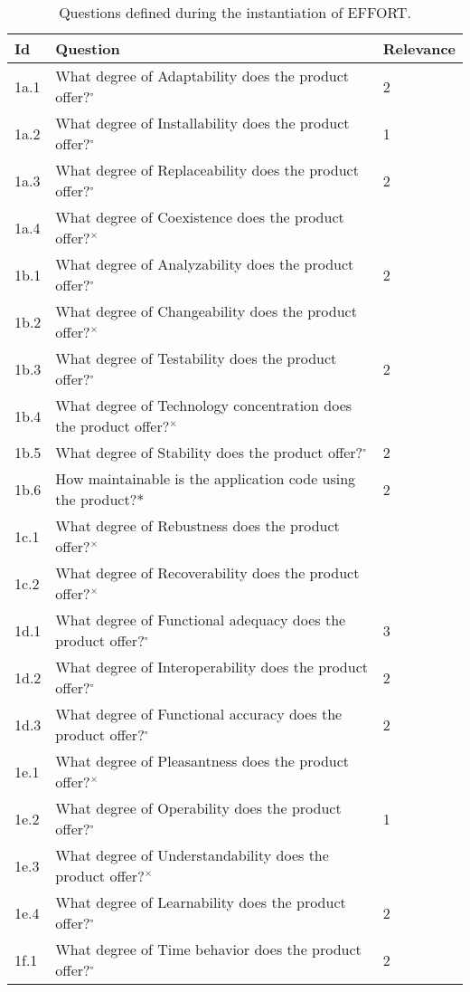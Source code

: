 \begin{longtable}[]{|p{1cm}p{10cm}p{2cm}|}
    \caption{Questions defined during the instantiation of EFFORT.}
    \label{table:questions_minified}\\
    \toprule
Id & Question & Relevance \\
\midrule
\endhead
1a.1 & What degree of Adaptability does the product offer?$^{\square}$ & 2 \\
1a.2 & What degree of Installability does the product offer?$^{\square}$ & 1 \\
1a.3 & What degree of Replaceability does the product offer?$^{\square}$ & 2 \\
1a.4 & What degree of Coexistence does the product offer?$^{\times}$ & \\
1b.1 & What degree of Analyzability does the product offer?$^{\square}$ & 2 \\
1b.2 & What degree of Changeability does the product offer?$^{\times}$ & \\
1b.3 & What degree of Testability does the product offer?$^{\square}$ & 2 \\
1b.4 & What degree of Technology concentration does the product offer?$^{\times}$ & \\
1b.5 & What degree of Stability does the product offer?$^{\square}$ & 2 \\
1b.6 & How maintainable is the application code using the product?* & 2 \\
1c.1 & What degree of Rebustness does the product offer?$^{\times}$ & \\
1c.2 & What degree of Recoverability does the product offer?$^{\times}$ & \\
1d.1 & What degree of Functional adequacy does the product offer?$^{\square}$ & 3 \\
1d.2 & What degree of Interoperability does the product offer?$^{\square}$ & 2 \\
1d.3 & What degree of Functional accuracy does the product offer?$^{\square}$ & 2 \\
1e.1 & What degree of Pleasantness does the product offer?$^{\times}$ & \\
1e.2 & What degree of Operability does the product offer?$^{\square}$ & 1 \\
1e.3 & What degree of Understandability does the product offer?$^{\times}$ & \\
1e.4 & What degree of Learnability does the product offer?$^{\square}$ & 2 \\
1f.1 & What degree of Time behavior does the product offer?$^{\square}$ & 2 \\

\end{longtable}
